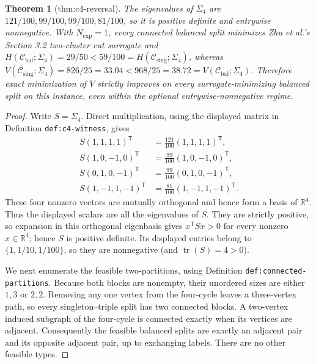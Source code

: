 \documentclass{article}
\newtheorem{theorem}{Theorem}
\begin{document}
\begin{theorem}[thm:c4-reversal]\label{thm:c4-reversal}
The eigenvalues of \(\Sigma_4\) are \(121/100,99/100,99/100,81/100\), so it is positive definite and entrywise nonnegative. With \(N_{\exp}=1\), every connected balanced split minimizes Zhu et al.'s Section 3.2 two-cluster cut surrogate and \(H(\mathcal C_{\mathrm{bal}};\Sigma_4)=29/50<59/100=H(\mathcal C_{\mathrm{sing}};\Sigma_4)\), whereas \(V(\mathcal C_{\mathrm{sing}};\Sigma_4)=826/25=33.04<968/25=38.72=V(\mathcal C_{\mathrm{bal}};\Sigma_4)\). Therefore exact minimization of \(V\) strictly improves on every surrogate-minimizing balanced split on this instance, even within the optional entrywise-nonnegative regime.
\end{theorem}
\begin{proof}
Write \(S=\Sigma_4\).  Direct multiplication, using the displayed matrix in Definition \texttt{def:c4-witness}, gives
\[
\begin{aligned}
S(1,1,1,1)^{\mathsf T}&=\frac{121}{100}(1,1,1,1)^{\mathsf T},\\
S(1,0,-1,0)^{\mathsf T}&=\frac{99}{100}(1,0,-1,0)^{\mathsf T},\\
S(0,1,0,-1)^{\mathsf T}&=\frac{99}{100}(0,1,0,-1)^{\mathsf T},\\
S(1,-1,1,-1)^{\mathsf T}&=\frac{81}{100}(1,-1,1,-1)^{\mathsf T}.
\end{aligned}
\]
These four nonzero vectors are mutually orthogonal and hence form a basis of \(\mathbb R^4\).  Thus the displayed scalars are all the eigenvalues of \(S\).  They are strictly positive, so expansion in this orthogonal eigenbasis gives \(x^{\mathsf T}Sx>0\) for every nonzero \(x\in\mathbb R^4\); hence \(S\) is positive definite.  Its displayed entries belong to \(\{1,1/10,1/100\}\), so they are nonnegative (and \(\operatorname{tr}(S)=4>0\)).

We next enumerate the feasible two-partitions, using Definition \texttt{def:connected-partitions}.  Because both blocks are nonempty, their unordered sizes are either \(1,3\) or \(2,2\).  Removing any one vertex from the four-cycle leaves a three-vertex path, so every singleton--triple split has two connected blocks.  A two-vertex induced subgraph of the four-cycle is connected exactly when its vertices are adjacent.  Consequently the feasible balanced splits are exactly an adjacent pair and its opposite adjacent pair, up to exchanging labels.  There are no other feasible types.


\end{proof}
\end{document}
